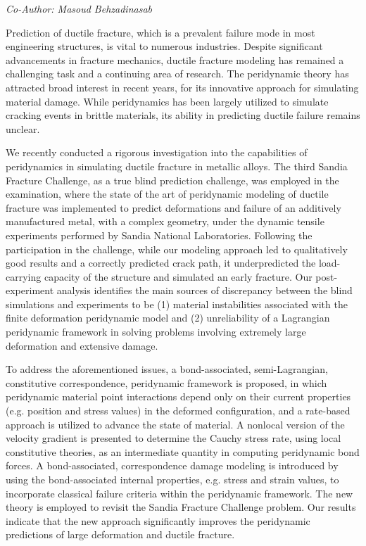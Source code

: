 \begin{center}
\textit{Co-Author: Masoud Behzadinasab}
\end{center} 
Prediction of ductile fracture, which is a prevalent failure mode in most engineering structures, is vital to numerous industries. Despite significant advancements in fracture mechanics, ductile fracture modeling has remained a challenging task and a continuing area of research. The peridynamic theory has attracted broad interest in recent years, for its innovative approach for simulating material damage. While peridynamics has been largely utilized to simulate cracking events in brittle materials, its ability in predicting ductile failure remains unclear.

We recently conducted a rigorous investigation into the capabilities of peridynamics in simulating ductile fracture in metallic alloys. The third Sandia Fracture Challenge, as a true blind prediction challenge, was employed in the examination, where the state of the art of peridynamic modeling of ductile fracture was implemented to predict deformations and failure of an additively manufactured metal, with a complex geometry, under the dynamic tensile experiments performed by Sandia National Laboratories. Following the participation in the challenge, while our modeling approach led to qualitatively good results and a correctly predicted crack path, it underpredicted the load-carrying capacity of the structure and simulated an early fracture. Our post-experiment analysis identifies the main sources of discrepancy between the blind simulations and experiments to be (1) material instabilities associated with the finite deformation peridynamic model and (2) unreliability of a Lagrangian peridynamic framework in solving problems involving extremely large deformation and extensive damage.

To address the aforementioned issues, a bond-associated, semi-Lagrangian, constitutive correspondence, peridynamic framework is proposed, in which peridynamic material point interactions depend only on their current properties (e.g. position and stress values) in the deformed configuration, and a rate-based approach is utilized to advance the state of material. A nonlocal version of the velocity gradient is presented to determine the Cauchy stress rate, using local constitutive theories, as an intermediate quantity in computing peridynamic bond forces. A bond-associated, correspondence damage modeling is introduced by using the bond-associated internal properties, e.g. stress and strain values, to incorporate classical failure criteria within the peridynamic framework. The new theory is employed to revisit the Sandia Fracture Challenge problem. Our results indicate that the new approach significantly improves the peridynamic predictions of large deformation and ductile fracture.